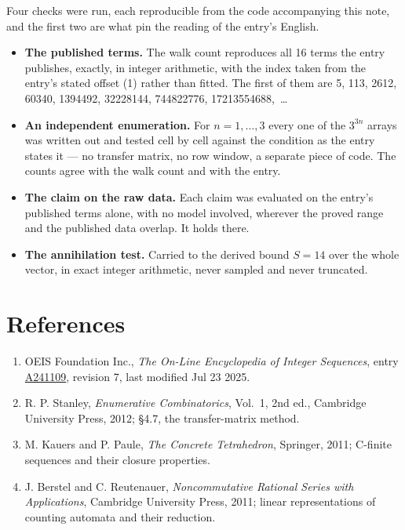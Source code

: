 \documentclass[11pt]{article}
\theoremstyle{definition}
\begin{document}
Four checks were run, each reproducible from the code accompanying this note, and the first two are what pin the reading of the entry's English.

\begin{itemize}

\item {\bfseries The published terms.} The walk count reproduces all 16 terms the entry publishes, exactly, in integer arithmetic, with the index taken from the entry's stated offset (1) rather than fitted. The first of them are 5, 113, 2612, 60340, 1394492, 32228144, 744822776, 17213554688,~\dots

\item {\bfseries An independent enumeration.} For $n = 1,\dots,3$ every one of the $3^{3n}$ arrays was written out and tested cell by cell against the condition as the entry states it --- no transfer matrix, no row window, a separate piece of code. The counts agree with the walk count and with the entry.

\item {\bfseries The claim on the raw data.} Each claim was evaluated on the entry's published terms alone, with no model involved, wherever the proved range and the published data overlap. It holds there.

\item {\bfseries The annihilation test.} Carried to the derived bound $S = 14$ over the whole vector, in exact integer arithmetic, never sampled and never truncated.

\end{itemize}

\section{References}

\begin{enumerate}

\item OEIS Foundation Inc., \emph{The On-Line Encyclopedia of Integer Sequences}, entry \href{https://oeis.org/A241109}{A241109}, revision 7, last modified Jul 23 2025.

\item R. P. Stanley, \emph{Enumerative Combinatorics}, Vol.~1, 2nd ed., Cambridge University Press, 2012; \S4.7, the transfer-matrix method.

\item M. Kauers and P. Paule, \emph{The Concrete Tetrahedron}, Springer, 2011; C-finite sequences and their closure properties.

\item J. Berstel and C. Reutenauer, \emph{Noncommutative Rational Series with Applications}, Cambridge University Press, 2011; linear representations of counting automata and their reduction.

\end{enumerate}
\end{document}
